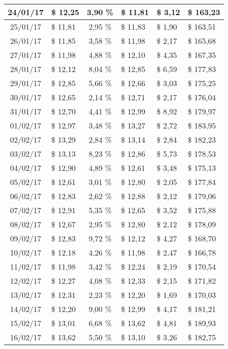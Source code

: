 \begin{center}
\begin{small}
\begin{longtable}{|c|l|c|l|l|l|}
24/01/17 & \$ 12,25 & 3,90 \% & \$ 11,81 & \$ 3,12 & \$ 163,23 \\ \hline
25/01/17 & \$ 11,81 & 2,95 \% & \$ 11,83 & \$ 1,90 & \$ 163,51 \\ \hline
26/01/17 & \$ 11,85 & 3,58 \% & \$ 11,98 & \$ 2,17 & \$ 165,68 \\ \hline
27/01/17 & \$ 11,98 & 4,88 \% & \$ 12,10 & \$ 4,35 & \$ 167,35 \\ \hline
28/01/17 & \$ 12,12 & 8,04 \% & \$ 12,85 & \$ 6,59 & \$ 177,83 \\ \hline
29/01/17 & \$ 12,85 & 5,66 \% & \$ 12,66 & \$ 3,03 & \$ 175,25 \\ \hline
30/01/17 & \$ 12,65 & 2,14 \% & \$ 12,71 & \$ 2,17 & \$ 176,04 \\ \hline
31/01/17 & \$ 12,70 & 4,41 \% & \$ 12,99 & \$ 8,92 & \$ 179,97 \\ \hline
01/02/17 & \$ 12,97 & 3,48 \% & \$ 13,27 & \$ 2,72 & \$ 183,95 \\ \hline
02/02/17 & \$ 13,29 & 2,84 \% & \$ 13,14 & \$ 2,84 & \$ 182,23 \\ \hline
03/02/17 & \$ 13,13 & 8,23 \% & \$ 12,86 & \$ 5,73 & \$ 178,53 \\ \hline
04/02/17 & \$ 12,90 & 4,89 \% & \$ 12,61 & \$ 3,48 & \$ 175,13 \\ \hline
05/02/17 & \$ 12,61 & 3,01 \% & \$ 12,80 & \$ 2,05 & \$ 177,84 \\ \hline
06/02/17 & \$ 12,83 & 2,62 \% & \$ 12,88 & \$ 2,12 & \$ 179,06 \\ \hline
07/02/17 & \$ 12,91 & 5,35 \% & \$ 12,65 & \$ 3,52 & \$ 175,88 \\ \hline
08/02/17 & \$ 12,67 & 2,95 \% & \$ 12,80 & \$ 2,12 & \$ 178,09 \\ \hline
09/02/17 & \$ 12,83 & 9,72 \% & \$ 12,12 & \$ 4,27 & \$ 168,70 \\ \hline
10/02/17 & \$ 12,18 & 4,26 \% & \$ 11,98 & \$ 2,47 & \$ 166,78 \\ \hline
11/02/17 & \$ 11,98 & 3,42 \% & \$ 12,24 & \$ 2,19 & \$ 170,54 \\ \hline
12/02/17 & \$ 12,27 & 4,08 \% & \$ 12,33 & \$ 2,15 & \$ 171,82 \\ \hline
13/02/17 & \$ 12,31 & 2,23 \% & \$ 12,20 & \$ 1,69 & \$ 170,03 \\ \hline
14/02/17 & \$ 12,20 & 9,00 \% & \$ 12,99 & \$ 4,17 & \$ 181,21 \\ \hline
15/02/17 & \$ 13,01 & 6,68 \% & \$ 13,62 & \$ 4,81 & \$ 189,93 \\ \hline
16/02/17 & \$ 13,62 & 5,50 \% & \$ 13,10 & \$ 3,26 & \$ 182,75 \\ \hline

\end{longtable}
\end{small}
\end{center}
